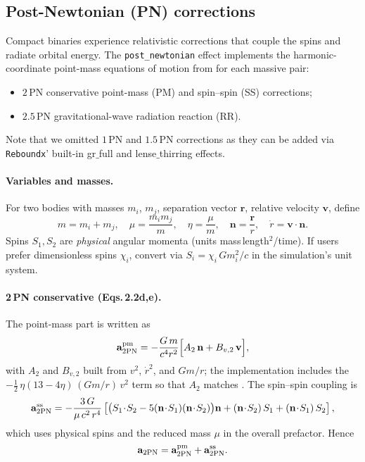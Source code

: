 \documentclass[11pt]{article}
\begin{document}
\subsection{Post-Newtonian (PN) corrections}
\label{sec:pn}

Compact binaries experience relativistic corrections that couple the spins and
radiate orbital energy. The \texttt{post\_newtonian} effect implements the
harmonic-coordinate point-mass equations of motion from \citet{Kidder1995} for
each massive pair:
\begin{itemize}[nosep,leftmargin=1.8em]
  \item $2$\,PN conservative point-mass (PM) and spin--spin (SS) corrections;
  \item $2.5$\,PN gravitational-wave radiation reaction (RR).
\end{itemize}
Note that we omitted  $1$\,PN and $1.5$\,PN corrections as they can be added via \texttt{Reboundx}' built-in gr$\_$full and lense$\_$thirring effects.


\paragraph{Variables and masses.}
For two bodies with masses $m_i$, $m_j$, separation vector $\mathbf{r}$,
relative velocity $\mathbf{v}$, define
\[
  m = m_i + m_j,\quad
  \mu = \frac{m_i m_j}{m},\quad
  \eta = \frac{\mu}{m},\quad
  \mathbf{n} = \frac{\mathbf{r}}{r},\quad
  \dot r = \mathbf{v}\cdot\mathbf{n}.
\]
Spins $S_1,S_2$ are \emph{physical} angular momenta (units mass\,length$^2$/time).
If users prefer dimensionless spins $\chi_i$, convert via
$S_i = \chi_i\,G m_i^2 / c$ in the simulation's unit system.

\paragraph{2\,PN conservative (Eqs.\,2.2d,e).}
The point-mass part is written as
\[
\mathbf{a}_{2\mathrm{PN}}^{\rm pm}
= -\frac{G\,m}{c^4 r^2}
   \Bigl[A_{2}\,\mathbf{n} + B_{v,2}\,\mathbf{v}\Bigr],
\]
with $A_2$ and $B_{v,2}$ built from $v^2$, $\dot r^2$, and $Gm/r$;
the implementation includes the \(-\tfrac12\,\eta(13-4\eta)\,(Gm/r)\,v^2\) term
so that $A_2$ matches \citet{Kidder1995}. The spin--spin coupling is
\[
  \mathbf{a}_{2\mathrm{PN}}^{\rm ss}
  = -\frac{3\,G}{\mu\,c^2\,r^4}
    \left[
      \bigl(S_1\!\cdot\!S_2 - 5(\mathbf{n}\!\cdot\!S_1)(\mathbf{n}\!\cdot\!S_2)\bigr)\mathbf{n}
      + (\mathbf{n}\!\cdot\!S_2)\,S_1 + (\mathbf{n}\!\cdot\!S_1)\,S_2
    \right],
\]
which uses physical spins and the reduced mass $\mu$ in the overall prefactor.
Hence
\[
  \mathbf{a}_{2\mathrm{PN}}=\mathbf{a}_{2\mathrm{PN}}^{\rm pm}+\mathbf{a}_{2\mathrm{PN}}^{\rm ss}.
\]
\end{document}
